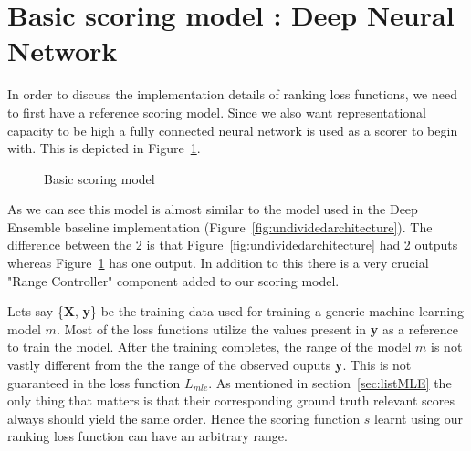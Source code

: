 \documentclass[12pt, twoside, ngerman]{report}
\begin{document}
\section{Basic scoring model : Deep Neural Network}
\label{sec:BasicScoringModelDNN}
In order to discuss the implementation details of ranking loss functions,  we need to first have a reference scoring model.
Since we also want representational capacity to be high a fully connected neural network is used as a scorer to begin with.
This is depicted in Figure~\ref{fig:basicScoringModel}.
\begin{figure}[htb]
\centering
{}
\caption{Basic scoring model}
\label{fig:basicScoringModel}
\end{figure}

As we can see this model is almost similar to the model used in the Deep Ensemble baseline implementation (Figure~\ref{fig:undividedarchitecture}).
The difference between the 2 is that Figure~\ref{fig:undividedarchitecture} had 2 outputs whereas Figure~\ref{fig:basicScoringModel} has one output.
In addition to this there is a very crucial "Range Controller" component added to our scoring model.

Lets say \{\textbf{X}, \textbf{y}\} be the training data used for training a generic machine learning model $m$.
Most of the loss functions utilize the values present in \textbf{y} as a reference to train the model.
After the training completes,  the range of the model $m$ is not vastly different from the the range of the observed ouputs \textbf{y}.
This is not guaranteed in the loss function $L_{mle}$.
As mentioned in section~\ref{sec:listMLE} the only thing that matters is that their corresponding ground truth relevant scores always should yield the same order.
Hence the scoring function $s$ learnt using our ranking loss function can have an arbitrary range.
\end{document}
